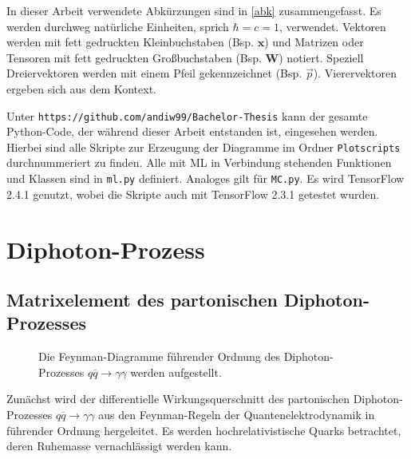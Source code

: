 In dieser Arbeit verwendete Abkürzungen sind in \textsf{\autoref{abk}} zusammengefasst.
Es werden durchweg natürliche Einheiten, sprich $\hbar = c = 1$, verwendet. Vektoren werden mit fett gedruckten Kleinbuchstaben (Bsp. $\mathbf{x}$) und Matrizen oder Tensoren mit fett gedruckten Großbuchstaben (Bsp. $\mathbf{W}$) notiert. Speziell Dreiervektoren werden mit einem Pfeil gekennzeichnet (Bsp. $\vec{p}$). Vierervektoren ergeben sich aus dem Kontext. 

Unter \texttt{https://github.com/andiw99/Bachelor-Thesis} kann der gesamte Python-Code, der während dieser Arbeit entstanden ist, eingesehen werden. Hierbei sind alle Skripte zur Erzeugung der Diagramme im Ordner \texttt{Plotscripts} durchnummeriert zu finden. Alle mit ML in Verbindung stehenden Funktionen und Klassen sind in \texttt{ml.py} definiert. Analoges gilt für \texttt{MC.py}. Es wird TensorFlow \cite{TF} 2.4.1 genutzt, wobei die Skripte auch mit TensorFlow 2.3.1 getestet wurden.

\chapter{Diphoton-Prozess}
\label{2}
\section{Matrixelement des partonischen Diphoton-Prozesses}
\begin{figure}
	\quad
	\caption{Die Feynman-Diagramme führender Ordnung des Diphoton-Prozesses $q\overline{q} \rightarrow \gamma \gamma$ werden aufgestellt.}
	\label{feynman-diagramme}
\end{figure}
Zunächst wird der differentielle Wirkungsquerschnitt des partonischen Diphoton-Prozesses $q\overline{q} \rightarrow \gamma \gamma$ aus den Feynman-Regeln der Quantenelektrodynamik in führender Ordnung hergeleitet. Es werden hochrelativistische Quarks betrachtet, deren Ruhemasse vernachlässigt werden kann.

